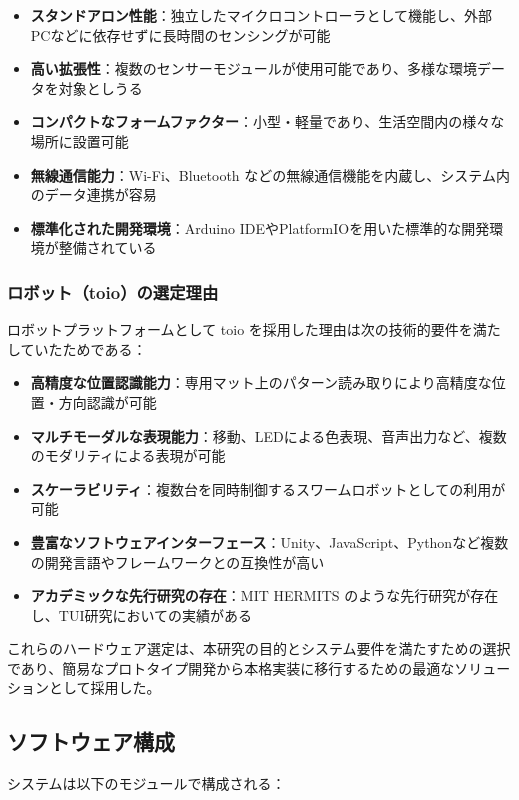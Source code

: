 \documentclass{cuxarticle}
\begin{document}
\begin{itemize}
  \item \textbf{スタンドアロン性能}：独立したマイクロコントローラとして機能し、外部PCなどに依存せずに長時間のセンシングが可能
  \item \textbf{高い拡張性}：複数のセンサーモジュールが使用可能であり、多様な環境データを対象としうる
  \item \textbf{コンパクトなフォームファクター}：小型・軽量であり、生活空間内の様々な場所に設置可能
  \item \textbf{無線通信能力}：Wi-Fi、Bluetooth などの無線通信機能を内蔵し、システム内のデータ連携が容易
  \item \textbf{標準化された開発環境}：Arduino IDEやPlatformIOを用いた標準的な開発環境が整備されている
\end{itemize}

\subsubsection{ロボット（toio）の選定理由}
ロボットプラットフォームとして toio を採用した理由は次の技術的要件を満たしていたためである：

\begin{itemize}
  \item \textbf{高精度な位置認識能力}：専用マット上のパターン読み取りにより高精度な位置・方向認識が可能
  \item \textbf{マルチモーダルな表現能力}：移動、LEDによる色表現、音声出力など、複数のモダリティによる表現が可能
  \item \textbf{スケーラビリティ}：複数台を同時制御するスワームロボットとしての利用が可能
  \item \textbf{豊富なソフトウェアインターフェース}：Unity、JavaScript、Pythonなど複数の開発言語やフレームワークとの互換性が高い
  \item \textbf{アカデミックな先行研究の存在}：MIT HERMITS のような先行研究が存在し、TUI研究においての実績がある
\end{itemize}

これらのハードウェア選定は、本研究の目的とシステム要件を満たすための選択であり、簡易なプロトタイプ開発から本格実装に移行するための最適なソリューションとして採用した。

\subsection{ソフトウェア構成}
システムは以下のモジュールで構成される：
\end{document}
